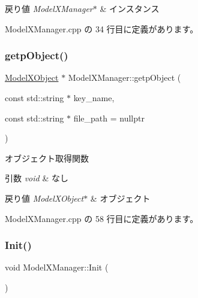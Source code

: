 \begin{DoxyRetVals}{戻り値}
{\em Model\+X\+Manager$\ast$} & インスタンス \\
\hline
\end{DoxyRetVals}


 Model\+X\+Manager.\+cpp の 34 行目に定義があります。

\mbox{\label{class_model_x_manager_ab4c3b09885b975da1e42644b5335472f}} 
\subsubsection{\texorpdfstring{getp\+Object()}{getpObject()}}
{\footnotesize\ttfamily \mbox{\hyperlink{class_model_x_object}{Model\+X\+Object}} $\ast$ Model\+X\+Manager\+::getp\+Object (\begin{DoxyParamCaption}\item[{const std\+::string $\ast$}]{key\+\_\+name,  }\item[{const std\+::string $\ast$}]{file\+\_\+path = {\ttfamily nullptr} }\end{DoxyParamCaption})}



オブジェクト取得関数 


\begin{DoxyParams}{引数}
{\em void} & なし \\
\hline
\end{DoxyParams}

\begin{DoxyRetVals}{戻り値}
{\em Model\+X\+Object$\ast$} & オブジェクト \\
\hline
\end{DoxyRetVals}


 Model\+X\+Manager.\+cpp の 58 行目に定義があります。

\mbox{\label{class_model_x_manager_a77fcb11b4229352c68e61736935a7ece}} 
\subsubsection{\texorpdfstring{Init()}{Init()}}
{\footnotesize\ttfamily void Model\+X\+Manager\+::\+Init (\begin{DoxyParamCaption}{ }\end{DoxyParamCaption})}



